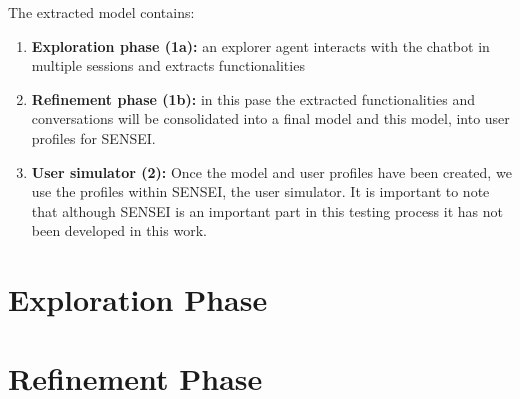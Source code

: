 The extracted model contains:

\begin{enumerate}
  \item \textbf{Exploration phase (1a):}
    an explorer agent interacts with the chatbot in multiple sessions
    and extracts functionalities

  \item \textbf{Refinement phase (1b):}
    in this pase the extracted functionalities and conversations
    will be consolidated into a final model
    and this model, into user profiles for SENSEI.

  \item \textbf{User simulator (2):}
    Once the model and user profiles have been created,
    we use the profiles within SENSEI, the user simulator.
    It is important to note that
    although SENSEI is an important part in this testing process
    it has not been developed in this work.
\end{enumerate}




\section{Exploration Phase}\label{sec:exploration}

\section{Refinement Phase}\label{sec:refinement}


